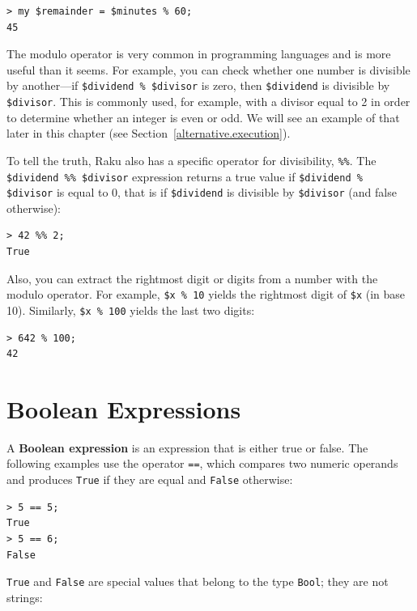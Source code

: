 \begin{verbatim}
> my $remainder = $minutes % 60;
45
\end{verbatim}
%
The modulo operator is very common in programming languages
and is more useful than it seems.  For example, you can 
check whether one number is divisible by another---if 
{\tt \$dividend \% \$divisor} is zero, then {\tt \$dividend} 
is divisible by {\tt \$divisor}. This is commonly used, for 
example, with a divisor equal to 2 in order to determine 
whether an integer is even or odd. We will see an example 
of that later in this chapter (see Section~\ref{alternative.execution}).

To tell the truth, Raku also has a specific operator for 
divisibility, \verb"%%". The \verb'$dividend %% $divisor' 
expression returns a true value if
\verb'$dividend % $divisor' is equal to 0,  
that is if {\tt \$dividend} is divisible by {\tt \$divisor} (and false otherwise):
\begin{verbatim}
> 42 %% 2;
True
\end{verbatim}

Also, you can extract the rightmost digit
or digits from a number with the modulo operator.  For example, {\tt \$x \% 10} yields the
rightmost digit of {\tt \$x} (in base 10).  Similarly, {\tt \$x \% 100}
yields the last two digits:

\begin{verbatim}
> 642 % 100;
42
\end{verbatim}
%



\section{Boolean Expressions}

A {\bf Boolean expression} is an expression that is either true
or false.  The following examples use the operator {\tt ==}, 
which compares two numeric operands and produces
{\tt True} if they are equal and {\tt False} otherwise:

\begin{verbatim}
> 5 == 5;
True
> 5 == 6;
False
\end{verbatim}
%
{\tt True} and {\tt False} are special
values that belong to the type {\tt Bool}; they are not strings:

